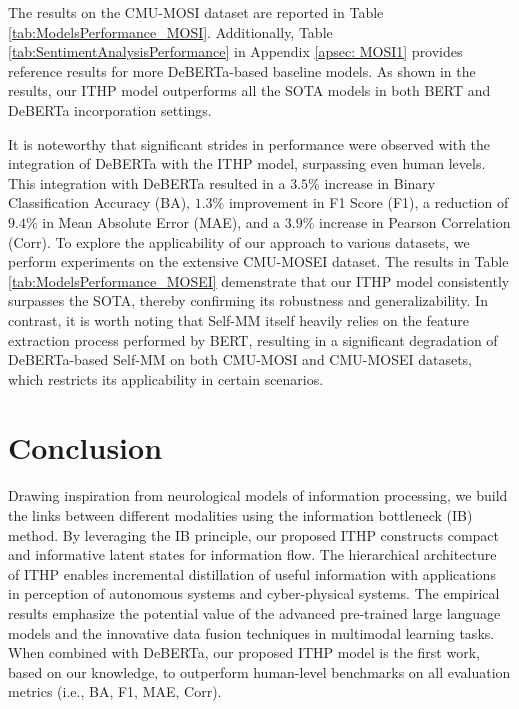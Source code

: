 \documentclass{article} %
\begin{document}
The results on the CMU-MOSI dataset are reported in Table \ref{tab:ModelsPerformance_MOSI}. Additionally, Table \ref{tab:SentimentAnalysisPerformance} in Appendix \ref{apsec: MOSI1} provides reference results for more DeBERTa-based baseline models. As shown in the results, our ITHP model outperforms all the SOTA models in both BERT and DeBERTa incorporation settings.

It is noteworthy that significant strides in performance were observed with the integration of DeBERTa with the ITHP model, surpassing even human levels. This integration with DeBERTa resulted in a $3.5\%$ increase in Binary Classification Accuracy (BA), $1.3\%$ improvement in F1 Score (F1), a reduction of $9.4\%$ in Mean Absolute Error (MAE), and a $3.9\%$ increase in Pearson Correlation (Corr). To explore the applicability of our approach to various datasets, we perform experiments on the extensive CMU-MOSEI dataset. The results in Table \ref{tab:ModelsPerformance_MOSEI} demenstrate that our ITHP model consistently surpasses the SOTA, thereby confirming its robustness and generalizability. In contrast, it is worth noting that Self-MM itself heavily relies on the feature extraction process performed by BERT, resulting in a significant degradation of DeBERTa-based Self-MM on both CMU-MOSI and CMU-MOSEI datasets, which restricts its applicability in certain scenarios. 


\section{Conclusion}
Drawing inspiration from neurological models of information processing, we build the links between different modalities using the information bottleneck (IB) method. By leveraging the IB principle, our proposed ITHP constructs compact and informative latent states for information flow. The hierarchical architecture of ITHP enables incremental distillation of useful information with applications in perception of autonomous systems and cyber-physical systems. 
The empirical results emphasize the potential value of the advanced pre-trained large language models and the innovative data fusion techniques in multimodal learning tasks. When combined with DeBERTa, our proposed ITHP model is the first work, based on our knowledge, to outperform human-level benchmarks on all evaluation metrics (i.e., BA, F1, MAE, Corr).
\end{document}
